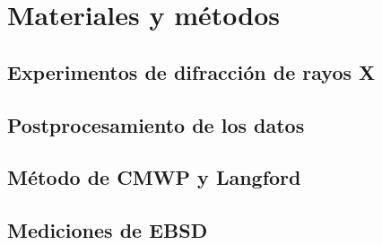 \chapter{Materiales y métodos}\label{C:Materiales}
\graphicspath{{./figs/02_Mat/}}
\section{Experimentos de difracción de rayos X}\label{S:MatXRD}
\section{Postprocesamiento de los datos}\label{S:MatPost}
\section{Método de CMWP y Langford}\label{S:MatCMWP}
\section{Mediciones de EBSD}\label{S:MatEBSD}

